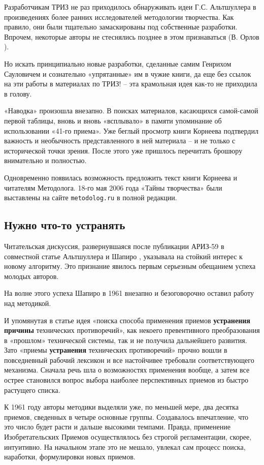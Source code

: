 \documentclass[11pt,a4paper]{article}
\begin{document}
Разработчикам ТРИЗ не раз приходилось обнаруживать идеи Г.С. Альтшуллера в
произведениях более ранних исследователей методологии творчества. Как правило,
они были тщательно замаскированы под собственные разработки. Впрочем,
некоторые авторы не стеснялись позднее в этом признаваться (В. Орлов
\cite{OrlovNN}).

Но искать принципиально новые разработки, сделанные самим Генрихом Сауловичем
и сознательно «упрятанные» им в чужие книги, да еще без ссылок на эти работы в
материалах по ТРИЗ! -- эта крамольная идея как-то не приходила в голову.

«Наводка» произошла внезапно. В поисках материалов, касающихся самой-самой
первой таблицы, вновь и вновь «всплывало» в памяти упоминание об использовании
«41-го приема». Уже беглый просмотр книги Корнеева подтвердил важность и
необычность представленного в ней материала -- и не только с исторической
точки зрения. После этого уже пришлось перечитать брошюру внимательно и
полностью.

Одновременно появилась возможность предложить текст книги Корнеева и читателям
Методолога. 18-го мая 2006 года «Тайны творчества» \cite{Korneev1962} были
выставлены на сайте \texttt{metodolog.ru} в полной редакции.

\subsection*{Нужно что-то устранять}

Читательская дискуссия, развернувшаяся после публикации АРИЗ-59 в совместной
статье Альтшуллера и Шапиро \cite{Altshuller1959}, указывала на стойкий
интерес к новому алгоритму. Это признание явилось первым серьезным обещанием
успеха молодых авторов.

На волне этого успеха Шапиро в 1961 внезапно и безоговорочно оставил работу
над методикой.

И упомянутая в статье идея «поиска способа применения приемов
\textbf{устранения причины} технических противоречий», как некоего
превентивного преобразования в «прошлом» технической системы, так и не
получила дальнейшего развития. Зато «приемы \textbf{устранения} технических
противоречий» прочно вошли в повседневный рабочий лексикон и все настойчивее
требовали соответствующего механизма. Сначала речь шла о возможностях
применения вообще, а затем все острее становился вопрос выбора наиболее
перспективных приемов из быстро растущего списка.

К 1961 году авторы методики выделяли уже, по меньшей мере, два десятка
приемов, сведенных в четыре основные группы. Создавалось впечатление, что это
число будет расти и дальше высокими темпами. Правда, применение
Изобретательских Приемов осуществлялось без строгой регламентации, скорее,
интуитивно. На начальном этапе это не мешало, увлекал сам процесс поиска,
наработки, формулировки новых приемов.
\end{document}
